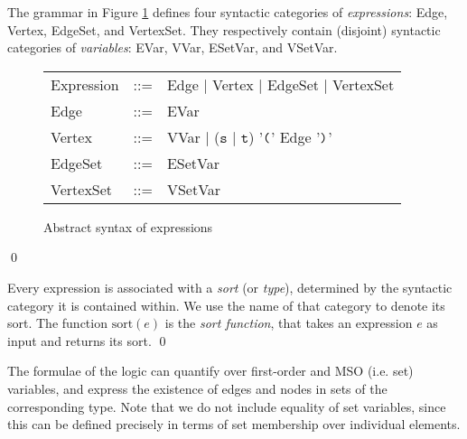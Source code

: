 \documentclass{llncs}
\newcommand{\mt}[1]{\text{\tt{#1}}}
\begin{document}
	\begin{definition}[Expressions]\label{defn:ms_logic:expressions}\rm
		The grammar in Figure \ref{fig:app:expressions} defines four syntactic categories of \emph{expressions}: Edge, Vertex, EdgeSet, and VertexSet. They respectively contain (disjoint) syntactic categories of \emph{variables}: EVar, VVar, ESetVar, and VSetVar.

	\vspace*{-.25\baselineskip} \begin{figure}[htb]
	\renewcommand{\arraystretch}{1.2}
	\begin{center}
	\begin{tabular}{lcl}
	Expression & ::= & Edge $\mid$ Vertex $\mid$ EdgeSet $\mid$ VertexSet \\
	Edge & ::= & EVar \\
	Vertex & ::= & VVar $\mid$ ($\mathtt{s}$ $\mid$ $\mathtt{t}$) '$\mt{(}$' Edge '$\mt{)}$'\\
	EdgeSet & ::= & ESetVar \\
	VertexSet & ::= & VSetVar \\
	\end{tabular}
	\end{center}
	\caption{Abstract syntax of expressions \label{fig:app:expressions}}
	\end{figure}
	\qed
	\end{definition}
	
	
	
	
	
	\begin{definition}\label{defn:app:sorts}\rm
		Every expression is associated with a \emph{sort} (or \emph{type}), determined by the syntactic category it is contained within. We use the name of that category to denote its sort. The function $\text{sort}(e)$ is the \emph{sort function}, that takes an expression $e$ as input and returns its sort.
	\qed
	\end{definition}
	
	The formulae of the logic can quantify over first-order and MSO (i.e. set) variables, and express the existence of edges and nodes in sets of the corresponding type. Note that we do not include equality of set variables, since this can be defined precisely in terms of set membership over individual elements.
	
\end{document}
